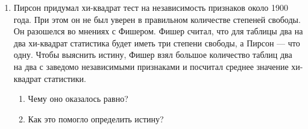 \documentclass[pdftex,12pt,a4paper]{article}
\begin{document}
\begin{enumerate}
\item Пирсон придумал хи-квадрат тест на независимость признаков около 1900 года. При этом он не был уверен в правильном количестве степеней свободы. Он разошелся во мнениях с Фишером. Фишер считал, что для таблицы два на два хи-квадрат статистика будет иметь три степени свободы, а Пирсон --- что одну. Чтобы выяснить истину, Фишер взял большое количество таблиц два на два с заведомо независимыми признаками и посчитал среднее значение хи-квадрат статистики. 
\begin{enumerate}
\item Чему оно оказалось равно?
\item Как это помогло определить истину?
\end{enumerate}


\end{enumerate}
\end{document}
